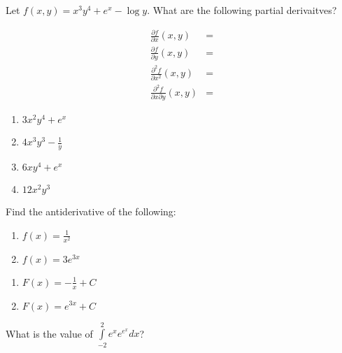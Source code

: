 \documentclass[
]{article}
\begin{document}
\setcounter{section}{3}

\begin{exercise}
\protect\hypertarget{exr:unnamed-chunk-19}{}\label{exr:unnamed-chunk-19}Let \(f(x,y)=x^3 y^4 +e^x -\log y\). What are the following partial derivaitves?

\begin{align*}
\frac{\partial f}{\partial x}(x,y) &=\\
\frac{\partial f}{\partial y}(x,y) &=\\
\frac{\partial^2 f}{\partial x^2}(x,y) &=\\
\frac{\partial^2 f}{\partial x \partial y}(x,y) &= 
\end{align*}
\end{exercise}

\begin{answer}
\noindent
\begin{enumerate}
\item $3x^2y^4 + e^x$
\item $4x^3y^3 - \frac{1}{y}$
\item $6xy^4 + e^x$
\item $12x^2y^3$
\end{enumerate}
\end{answer}

\begin{exercise}[Antiderivative]
\protect\hypertarget{exr:unnamed-chunk-21}{}\label{exr:unnamed-chunk-21}

Find the antiderivative of the following:

\begin{enumerate}
\def\labelenumi{\arabic{enumi}.}
\tightlist
\item
  \(f(x) = \frac{1}{x^2}\)
\item
  \(f(x) = 3e^{3x}\)
\end{enumerate}

\end{exercise}

\begin{answer}
\noindent
\begin{enumerate}
\item $F(x) = -\frac{1}{x} + C$
\item $F(x) = e^{3x} + C$
\end{enumerate}
\end{answer}

\begin{exercise}
\protect\hypertarget{exr:unnamed-chunk-29}{}\label{exr:unnamed-chunk-29}What is the value of \(\int\limits_{-2}^2 e^x e^{e^x} dx\)?
\end{exercise}
\end{document}

